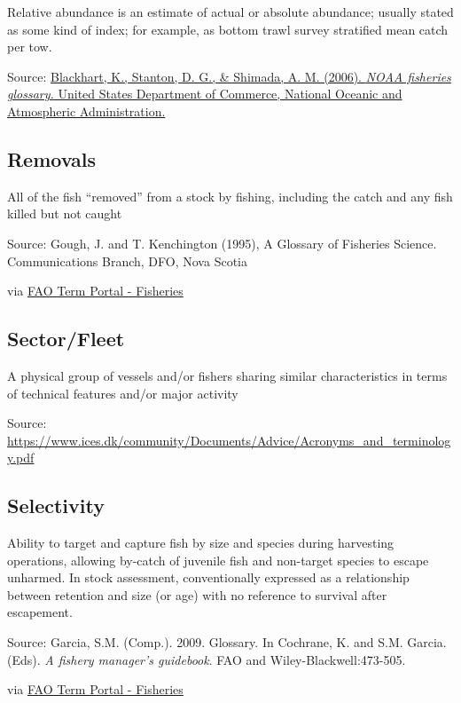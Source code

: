 \documentclass[
  11pt,
]{book}
\begin{document}
Relative abundance is an estimate of actual or absolute abundance; usually stated as some kind of index; for example, as bottom trawl survey stratiﬁed mean catch per tow.

Source: \href{https://repository.library.noaa.gov/view/noaa/12856}{Blackhart, K., Stanton, D. G., \& Shimada, A. M. (2006). \emph{NOAA fisheries glossary.} United States Department of Commerce, National Oceanic and Atmospheric Administration.}

\hypertarget{removals}{%
\subsection{Removals}\label{removals}}

All of the fish ``removed'' from a stock by fishing, including the catch and any fish killed but not caught

Source: Gough, J. and T. Kenchington (1995), A Glossary of Fisheries Science. Communications Branch, DFO, Nova Scotia

via \href{http://www.fao.org/fishery/glossary/en}{FAO Term Portal - Fisheries}

\hypertarget{sectorfleet}{%
\subsection{Sector/Fleet}\label{sectorfleet}}

A physical group of vessels and/or fishers sharing similar characteristics in terms of technical features and/or major activity

Source: \url{https://www.ices.dk/community/Documents/Advice/Acronyms_and_terminology.pdf}

\hypertarget{selectivity}{%
\subsection{Selectivity}\label{selectivity}}

Ability to target and capture fish by size and species during harvesting operations, allowing by-catch of juvenile fish and non-target species to escape unharmed. In stock assessment, conventionally expressed as a relationship between retention and size (or age) with no reference to survival after escapement.

Source: Garcia, S.M. (Comp.). 2009. Glossary. In Cochrane, K. and S.M. Garcia. (Eds). \emph{A fishery manager's guidebook}. FAO and Wiley-Blackwell:473-505.

via \href{http://www.fao.org/fishery/glossary/en}{FAO Term Portal - Fisheries}
\end{document}
